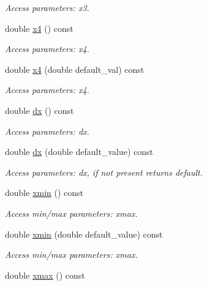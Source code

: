 \begin{DoxyCompactItemize}
\begin{DoxyCompactList}\small\item\em Access parameters\+: x3. \end{DoxyCompactList}\item 
double \hyperlink{struct_d_d4hep_1_1_x_m_l_1_1_dimension_a0d574d20118812741b1a070e878095cd}{x4} () const
\begin{DoxyCompactList}\small\item\em Access parameters\+: x4. \end{DoxyCompactList}\item 
double \hyperlink{struct_d_d4hep_1_1_x_m_l_1_1_dimension_ae1c6ca419eaaa0870a25d11dad91f653}{x4} (double default\+\_\+val) const
\begin{DoxyCompactList}\small\item\em Access parameters\+: x4. \end{DoxyCompactList}\item 
double \hyperlink{struct_d_d4hep_1_1_x_m_l_1_1_dimension_a61a21c1ac44a060a34c0c918ca999197}{dx} () const
\begin{DoxyCompactList}\small\item\em Access parameters\+: dx. \end{DoxyCompactList}\item 
double \hyperlink{struct_d_d4hep_1_1_x_m_l_1_1_dimension_aa305c414a6a91d0901fcdfc14793bc42}{dx} (double default\+\_\+value) const
\begin{DoxyCompactList}\small\item\em Access parameters\+: dx, if not present returns default. \end{DoxyCompactList}\item 
double \hyperlink{struct_d_d4hep_1_1_x_m_l_1_1_dimension_af8c0c3b620b90685dbca93a5b9338dc8}{xmin} () const
\begin{DoxyCompactList}\small\item\em Access min/max parameters\+: xmax. \end{DoxyCompactList}\item 
double \hyperlink{struct_d_d4hep_1_1_x_m_l_1_1_dimension_a3f6383624dfd9ee78e213d680ffefb01}{xmin} (double default\+\_\+value) const
\begin{DoxyCompactList}\small\item\em Access min/max parameters\+: xmax. \end{DoxyCompactList}\item 
double \hyperlink{struct_d_d4hep_1_1_x_m_l_1_1_dimension_a10d4fb0c07e0fc08e34a482b88f886fe}{xmax} () const

\end{DoxyCompactItemize}
